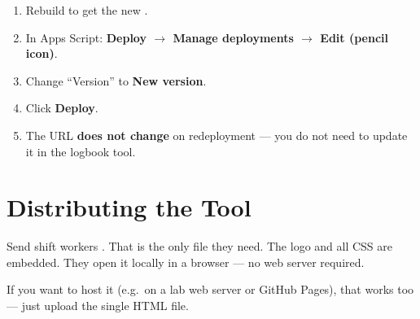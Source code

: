 \begin{enumerate}
    \item Rebuild to get the new .
    \item In Apps Script: \textbf{Deploy $\to$ Manage deployments $\to$ Edit
          (pencil icon)}.
    \item Change ``Version'' to \textbf{New version}.
    \item Click \textbf{Deploy}.
    \item The URL \textbf{does not change} on redeployment --- you do not need
          to update it in the logbook tool.
\end{enumerate}

\chapter{Distributing the Tool}

Send shift workers . That is the only
file they need. The logo and all CSS are embedded. They open it locally in a
browser --- no web server required.

If you want to host it (e.g.\ on a lab web server or GitHub Pages), that works
too --- just upload the single HTML file.


